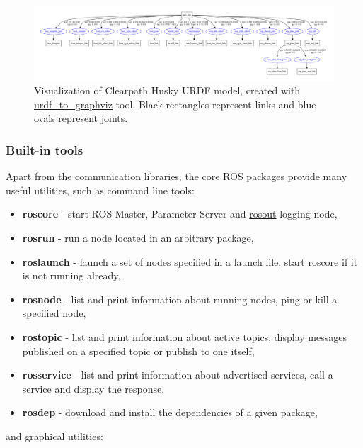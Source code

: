 \documentclass[english,inz,shortabstract]{iithesis}
\begin{document}
    \begin{figure}[ht]
        \centering
        \captionsetup{margin=1cm}
        \includegraphics[width=\textwidth]{img/husky.pdf}
        \caption{Visualization of Clearpath Husky URDF model, created with \href{http://wiki.ros.org/urdf\#Visualization}{urdf\_to\_graphviz} tool. Black rectangles represent links and blue ovals represent joints.}
        \label{fig:husky}
    \end{figure}

\pagebreak

        \subsubsection{Built-in tools}
        Apart from the communication libraries, the core ROS packages provide many useful utilities, such as command line tools:

        \begin{itemize}[itemsep=0pt, parsep=2pt, topsep=0pt]
            \item \textbf{roscore} - start ROS Master, Parameter Server and \href{http://wiki.ros.org/rosout#rosout-1}{rosout} logging node,
            \item \textbf{rosrun} - run a node located in an arbitrary package,
            \item \textbf{roslaunch} - launch a set of nodes specified in a launch file, start roscore if it is not running already,
            \item \textbf{rosnode} - list and print information about running nodes, ping or kill a specified node,
            \item \textbf{rostopic} - list and print information about active topics, display messages published on a specified topic or publish to one itself,
            \item \textbf{rosservice} - list and print information about advertised services, call a service and display the response,
            \item \textbf{rosdep} - download and install the dependencies of a given package,
        \end{itemize}
        and graphical utilities:
\end{document}
